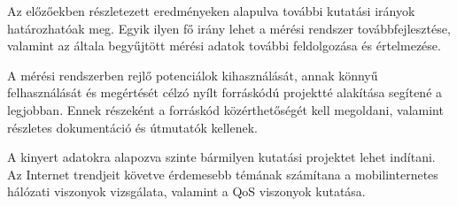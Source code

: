 Az előzőekben részletezett eredményeken alapulva további kutatási irányok határozhatóak meg. Egyik ilyen fő irány lehet a mérési rendszer továbbfejlesztése, valamint az általa begyűjtött mérési adatok további feldolgozása és értelmezése.

A mérési rendszerben rejlő potenciálok kihasználását, annak könnyű felhasználását és megértését célzó nyílt forráskódú projektté alakítása segítené a legjobban. Ennek részeként a forráskód közérthetőségét kell megoldani, valamint részletes dokumentáció és útmutatók kellenek.

A kinyert adatokra alapozva szinte bármilyen kutatási projektet lehet indítani. Az Internet trendjeit követve érdemesebb témának számítana a mobilinternetes hálózati viszonyok vizsgálata, valamint a QoS viszonyok kutatása.



%


